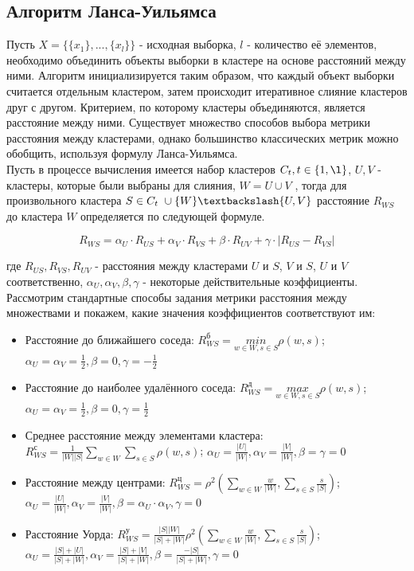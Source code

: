 \subsection*{Алгоритм Ланса-Уильямса} %

Пусть $X = \{\{x_1\},..., \{x_l\}\}$ - исходная выборка, $l$ - количество её элементов, необходимо объединить объекты выборки в кластере на основе расстояний между ними. Алгоритм инициализируется таким образом, что каждый объект выборки считается отдельным кластером, затем происходит итеративное слияние кластеров друг с другом. Критерием, по которому кластеры объединяются, является расстояние между ними. %
Существует множество способов выбора метрики расстояния между кластерами, однако большинство классических метрик можно обобщить, используя формулу Ланса-Уильямса.\\
Пусть в процессе вычисления имеется набор кластеров $C_t,t \in \{1, \l\}$, $U, V$ - кластеры, которые были выбраны для слияния, $W = U \cup V$ , тогда для произвольного кластера $S \in C_t\ \cup \{W\} \textbackslash \{U, V\}$ расстояние $R_{WS}$ до кластера $W$ определяется по следующей формуле.

\begin{equation*}
        R_{WS} = \alpha_U \cdot R_{US} + \alpha_V \cdot R_{VS} + \beta \cdot R_{UV} + \gamma \cdot |R_{US} - R_{VS}|
\end{equation*}

где $R_{US}, R_{VS}, R_{UV}$ - расстояния между кластерами $U$ и $S$, $V$ и $S$, $U$ и $V$ соответственно, $\alpha_U, \alpha_V, \beta, \gamma$ - некоторые действительные коэффициенты. Рассмотрим стандартные способы задания метрики расстояния между множествами и покажем, какие значения коэффициентов соответствуют им:

\begin{itemize}
    \item Расстояние до ближайшего соседа: $R^{\text{б}}_{WS} = \underset{w \in W, s \in S}{min}
  \rho (w, s)$; $\alpha_U = \alpha_V = \frac{1}{2}, \beta = 0, \gamma = - \frac{1}{2}$
    \item Расстояние до наиболее удалённого соседа: $R^{\text{д}}_{WS} = \underset{w \in W, s \in S}{max} \rho (w, s)$; $\alpha_U = \alpha_V = \frac{1}{2}, \beta = 0, \gamma = \frac{1}{2}$
    \item Среднее расстояние между элементами кластера: $R^{\text {с}}_{WS} = \frac{1}{|W||S|} \sum_{w \in W} \sum_{s \in S} \rho (w, s)$; $\alpha_U = \frac{|U|}{|W|}, \alpha_V = \frac{|V|}{|W|}, \beta = \gamma = 0$
    \item Расстояние между центрами: $R^{\text{ц}}_{WS} = \rho^2 \left( \sum_{w \in W} \frac{w}{|W|}, \sum_{s \in S} \frac{s}{|S|} \right)$; $\alpha_U = \frac{|U|}{|W|}, \alpha_V = \frac{|V|}{|W|}, \beta = \alpha_U \cdot \alpha_V, \gamma = 0$
    \item Расстояние Уорда: $R^{\text{у}}_{WS} = \frac{|S||W|}{|S|+|W|} \rho^2 \left( \sum_{w \in W} \frac{w}{|W|}, \sum_{s \in S} \frac{s}{|S|} \right)$; $\alpha_U = \frac{|S| + |U|}{|S|+|W|}, \alpha_V = \frac{|S|+|V|}{|S|+|W|}, \beta = \frac{-|S|}{|S|+|W|}, \gamma = 0$
\end{itemize}

